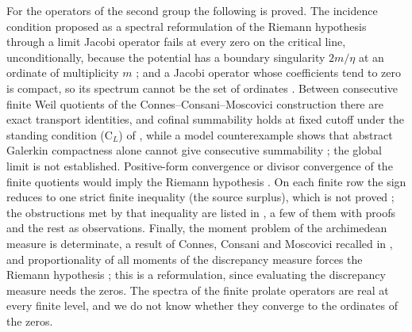 \documentclass[11pt]{amsart}
\theoremstyle{definition}
\theoremstyle{remark}
\numberwithin{equation}{section}
\begin{document}
For the operators of the second group the following is proved. The incidence condition proposed as
a spectral reformulation of the Riemann hypothesis through a limit Jacobi operator fails at every
zero on the critical line, unconditionally, because the potential has a boundary singularity
$2m/\eta$ at an ordinate of multiplicity $m$ \cite[Proposition~3.3]{P23}; and a Jacobi operator
whose coefficients tend to zero is compact, so its spectrum cannot be the set of ordinates
\cite[Proposition~3.2]{P23}. Between consecutive finite Weil quotients of the
Connes--Consani--Moscovici construction there are exact transport identities, and cofinal
summability holds at fixed cutoff under the standing condition (C$_L$) of \cite{P39}, while a model
counterexample shows that abstract Galerkin compactness alone cannot give consecutive summability
\cite[Theorems~3.2, 4.1 and 7.4, Proposition~9.1]{P39}; the global limit is not established.
Positive-form convergence or divisor convergence of the finite quotients would imply the Riemann
hypothesis \cite[Theorem~5.1]{P40}. On each finite row the sign reduces to one strict finite
inequality (the source surplus), which is not proved \cite[Section~9]{P40}; the obstructions met
by that inequality are listed in \cite{P41}, a few of them with proofs and the rest as
observations. Finally, the moment problem of the archimedean measure is determinate, a result of
Connes, Consani and Moscovici recalled in \cite[Lemma~2.5]{P22}, and proportionality of all moments
of the discrepancy measure forces the Riemann hypothesis \cite[Theorems~4.1 and 4.4]{P22}; this is
a reformulation, since evaluating the discrepancy measure needs the zeros. The spectra of the
finite prolate operators are real at every finite level, and we do not know whether they converge
to the ordinates of the zeros.
\end{document}
